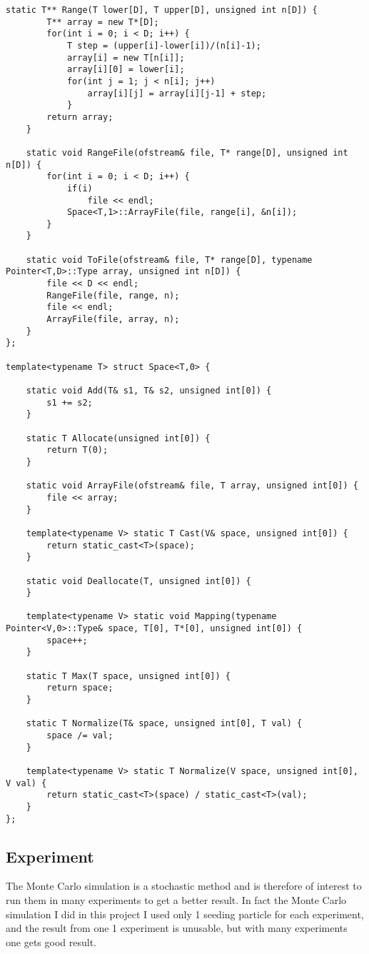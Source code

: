 \documentclass[11pt,english,a4paper]{article}
\begin{document}
\begin{flushleft}
\begin{lstlisting}[title={\texttt{struct Space}}]
	static T** Range(T lower[D], T upper[D], unsigned int n[D]) {
		T** array = new T*[D];
		for(int i = 0; i < D; i++) {
			T step = (upper[i]-lower[i])/(n[i]-1);
			array[i] = new T[n[i]];
			array[i][0] = lower[i];
			for(int j = 1; j < n[i]; j++)
				array[i][j] = array[i][j-1] + step;
			}
		return array;
	}
	
	static void RangeFile(ofstream& file, T* range[D], unsigned int n[D]) {
		for(int i = 0; i < D; i++) {
			if(i)
				file << endl;
			Space<T,1>::ArrayFile(file, range[i], &n[i]);
		}
	}
	
	static void ToFile(ofstream& file, T* range[D], typename Pointer<T,D>::Type array, unsigned int n[D]) {
		file << D << endl;
		RangeFile(file, range, n);
		file << endl;
		ArrayFile(file, array, n);
	}
};

template<typename T> struct Space<T,0> {

	static void Add(T& s1, T& s2, unsigned int[0]) {
		s1 += s2;
	}
	
	static T Allocate(unsigned int[0]) {
		return T(0);
	}
	
	static void ArrayFile(ofstream& file, T array, unsigned int[0]) {
		file << array;
	}
	
	template<typename V> static T Cast(V& space, unsigned int[0]) {
		return static_cast<T>(space);
	}
	
	static void Deallocate(T, unsigned int[0]) {
	}

	template<typename V> static void Mapping(typename Pointer<V,0>::Type& space, T[0], T*[0], unsigned int[0]) {
		space++;
	}
	
	static T Max(T space, unsigned int[0]) {
		return space;
	}
	
	static T Normalize(T& space, unsigned int[0], T val) {
		space /= val;
	}
	
	template<typename V> static T Normalize(V space, unsigned int[0], V val) {
		return static_cast<T>(space) / static_cast<T>(val);
	}
};
\end{lstlisting}

\subsection{Experiment}

The Monte Carlo simulation is a stochastic method and is therefore of interest to run them in many experiments to get a better result. In fact the Monte Carlo simulation I did in this project I used only 1 seeding particle for each experiment, and the result from one 1 experiment is unusable, but with many experiments one gets good result.  \linebreak


\end{flushleft}
\end{document}
